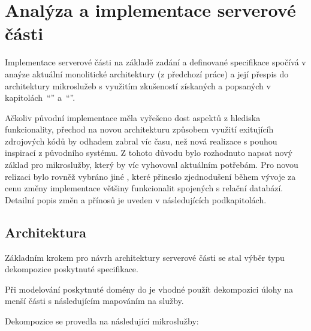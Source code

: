 \chapter{Analýza a implementace serverové části}\label{ch:server}


Implementace serverové části na základě zadání a definované specifikace  spočívá v anaýze aktuální monolitické architektury (z předchozí práce) a její přespis do architektury mikroslužeb s využitím zkušeností získaných a popsaných v kapitolách~\enquote{} a~\enquote{}.

Ačkoliv původní implementace měla vyřešeno dost aspektů z hlediska funkcionality, přechod na novou architekturu způsobem využití exitujícíh zdrojových kódů by odhadem zabral víc času, než nová realizace s pouhou inspirací z původního systému.
Z tohoto důvodu bylo rozhodnuto napsat nový základ pro mikroslužby, který by víc vyhovoval aktuálním potřebám.
Pro novou relizaci bylo rovněž vybráno jiné , které přineslo zjednodušení během vývoje za cenu změny implementace většiny funkcionalit spojených s relační databází.
Detailní popis změn a přínosů je uveden v následujících podkapitolách.

\newpage

\section{Architektura}\label{sec:server-arch}

Základním krokem pro návrh architektury serverové části se stal výběr typu dekompozice poskytnuté specifikace.


Při modelování poskytnuté domény do  je vhodné použít dekompozici úlohy na menší části s následujícím mapováním na služby.

Dekompozice se provedla na následující mikroslužby:



